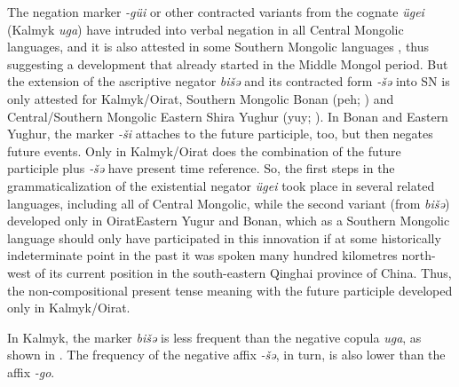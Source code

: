 \documentclass[output=paper,draft,draftmode,colorlinks,citecolor=brown]{langscibook}
\begin{document}
The negation marker \textit{-güi} or other contracted variants from the cognate \textit{ügei} (Kalmyk \textit{uga}) have intruded into verbal negation in all Central Mongolic languages, and it is also attested in some Southern Mongolic languages \citep[70--81]{brosig2015a}, thus suggesting a development that already started in the Middle Mongol period. But the extension of the ascriptive negator \textit{bišǝ} and its contracted form \textit{‑šǝ} into SN is only attested for Kalmyk/Oirat, Southern Mongolic Bonan (peh; \citealp{wu2003a}) and Central/Southern Mongolic Eastern Shira Yughur (yuy; \citealp{nugteren2003a}). In Bonan and Eastern Yughur, the marker \textit{-ši} attaches to the future participle, too, but then negates future events. Only in Kalmyk/Oirat does the combination of the future participle plus \textit{‑šǝ} have present time reference. So, the first steps in the grammaticalization of the existential negator \textit{ügei} took place in several related languages, including all of Central Mongolic, while the second variant (from \textit{bišǝ}) developed only in OiratEastern Yugur and Bonan, which as a Southern Mongolic language should only have participated in this innovation if at some historically indeterminate point in the past it was spoken many hundred kilometres north-west of its current position in the south-eastern Qinghai province of China. Thus, the non-compositional present tense meaning with the future participle developed only in Kalmyk/Oirat.

In Kalmyk, the marker \textit{bišǝ} is less frequent than the negative copula \textit{uga}, as shown in . The frequency of the negative affix \textit{-šǝ}, in turn, is also lower than the affix \textit{-go}.

\begin{table}[!h]
\caption{Frequency of \textit{bišǝ} and \textit{uga} and negation affixes in the written corpora.}
\label{tab:BK1}
\end{table}
\end{document}
